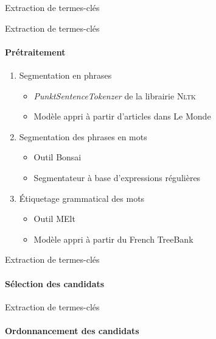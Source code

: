 \begin{frame}{Extraction de termes-clés}
\begin{center}
    \end{center}
  \end{frame}

  \begin{frame}{Extraction de termes-clés}
    \framesubtitle{Prétraitement}

    \begin{enumerate}
      \item<1->{Segmentation en phrases}
      \begin{itemize}
        \item{\textit{PunktSentenceTokenzer} de la librairie \textsc{Nltk}}
        \item{Modèle appri à partir d'articles dans Le Monde}
      \end{itemize}
      \item<2->{Segmentation des phrases en mots}
      \begin{itemize}
        \item{Outil Bonsai}
        \item{Segmentateur à base d'expressions régulières}
      \end{itemize}
      \item<3->{Étiquetage grammatical des mots}
      \begin{itemize}
        \item{Outil MElt}
        \item{Modèle appri à partir du French TreeBank}
      \end{itemize}
    \end{enumerate}
  \end{frame}

  \begin{frame}{Extraction de termes-clés}
    \framesubtitle{Sélection des candidats}

  \end{frame}

  \begin{frame}{Extraction de termes-clés}
    \framesubtitle{Ordonnancement des candidats}

  \end{frame}

